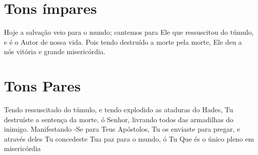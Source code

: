 \documentclass{subfiles}
\begin{document}
\section*{Tons ímpares}

Hoje a salvação veio para o mundo; cantemos para Ele que ressuscitou do túmulo,
e é o Autor de nossa vida.  Pois tendo destruído a morte pela morte,  Ele deu a
nós vitória e grande misericórdia.

\section*{Tons Pares}

Tendo ressuscitado do túmulo,  e tendo explodido as ataduras do Hades,  Tu
destruíste a sentença da morte, ó Senhor,  livrando todos das armadilhas do
inimigo.  Manifestando -Se para Teus Apóstolos,  Tu os enviaste para pregar,  e
através deles Tu concedeste Tua paz para o mundo, ó Tu Que és o único pleno em
misericórdia
\end{document}
